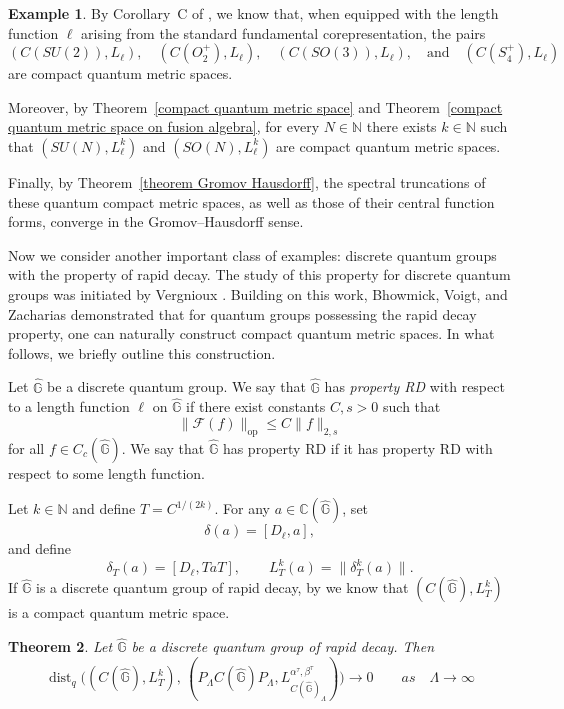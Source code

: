 \documentclass[12pt, reqno]{amsart}
\newtheorem{theorem}{Theorem}[section]
\theoremstyle{definition}
\newtheorem{example}[theorem]{Example}
\theoremstyle{remark}
\numberwithin{equation}{section}
\begin{document}
\begin{example}\label{ex:spectral-truncation-GH}
   By Corollary~C of \cite{16}, we know that, when equipped with the length function $\ell$ arising from the standard fundamental corepresentation, the pairs
\[
    (C(SU(2)),L_{\ell}),\quad (C(O_{2}^{+}),L_{\ell}),\quad
    (C(SO(3)),L_{\ell}),\quad \text{and}\quad (C(S_{4}^{+}),L_{\ell})
\]
are compact quantum metric spaces.

Moreover, by Theorem~\ref{compact quantum metric space} and Theorem~\ref{compact quantum metric space on fusion algebra}, for every $N\in\mathbb{N}$ there exists $k\in\mathbb{N}$ such that $(SU(N),L_\ell^k)$ and $(SO(N),L_\ell^k)$ are compact quantum metric spaces.

Finally, by Theorem~\ref{theorem Gromov Hausdorff}, the spectral truncations of these quantum compact metric spaces, as well as those of their central function forms, converge in the Gromov--Hausdorff sense.
\end{example}

Now we consider another important class of examples: discrete quantum groups 
with the property of rapid decay. The study of this property for discrete 
quantum groups was initiated by Vergnioux \cite{20}. Building on this work, 
Bhowmick, Voigt, and Zacharias \cite{23} demonstrated that for quantum groups 
possessing the rapid decay property, one can naturally construct compact 
quantum metric spaces. In what follows, we briefly outline this construction.

Let $\hat{\mathbb{G}}$ be a discrete quantum group. We say that $\hat{\mathbb{G}}$ has \emph{property RD} 
with respect to a length function $\ell$ on $\hat{\mathbb{G}}$ if there exist constants 
$C, s > 0$ such that
\[
\| \mathcal{F}(f) \|_{\mathrm{op}} \leq C \| f \|_{2,s}
\]
for all $f \in C_c(\hat{\mathbb{G}})$. We say that $\hat{\mathbb{G}}$ has property RD if it has property RD 
with respect to some length function.

Let $k \in \mathbb{N}$ and define $T = C^{1/(2k)}$. For any 
$a \in \mathbb{C}(\hat{\mathbb{G}})$, set
\[
\delta(a) = [D_\ell, a],
\]
and define
\[
\delta_T(a) = [D_\ell, T a T], \qquad L_T^k(a) = \|\delta_T^k(a)\|.
\]
If $\hat{\mathbb{G}}$ is a discrete quantum group of rapid decay, by \cite{20} we 
know that $(C(\hat{\mathbb{G}}), L_T^k)$ is a compact quantum metric space.



\begin{theorem}\label{theorem GH on discrete}
Let $\hat{\mathbb{G}}$ be a discrete quantum group of rapid decay. Then 
\[
\operatorname{dist}_q\bigl((C(\hat{\mathbb{G}}), L_{T}^k),\, 
(P_\Lambda C(\hat{\mathbb{G}}) P_\Lambda,L_{C(\hat{\mathbb{G}})_\Lambda}^{\alpha^\tau,\beta^\tau})\bigr) \to 0 \qquad as \quad\Lambda\to \infty
\]
\end{theorem}
\end{document}
